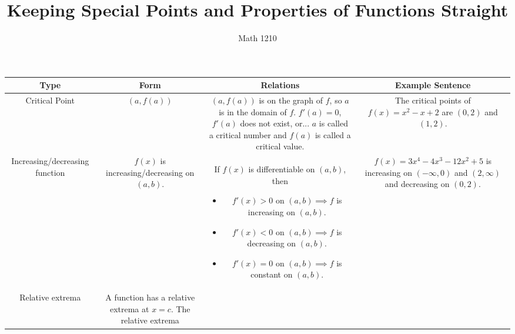 \documentclass[12pt, landscape]{article}
\author{Math 1210}
\title{Keeping Special Points and Properties of Functions Straight}
\date{}
\theoremstyle{mainstyle} %
\begin{document}
\maketitle
\begin{tabular}{c|c|c|c}
  Type
  &Form
  &Relations
  &Example Sentence \\
  \hline
  Critical Point
  &\((a,f(a))\)
  &\parbox{9cm}{\((a,f(a))\) is on the graph of
    \(f\), so \(a\) is in the domain of
    \(f\). \\
  \(f'(a) = 0\), \(f'(a)\) does not exist, or...\\
  \(a\) is called a critical number and \(f(a)\) is called a critical value.}
  &\parbox{5cm}{The critical points of \(f(x) = x^2-x+2\) are
    \((0,2)\) and \((1,2)\).} \\
  \hline
  Increasing/decreasing function
  & \parbox{4cm}{\(f(x)\) is increasing/decreasing on \((a,b)\).}
  & \parbox{9cm}{If \(f(x)\) is differentiable on \((a,b)\), then
    \begin{itemize}
    \item \(f'(x) > 0\) on \((a,b) \implies f\) is increasing on \((a,b)\).
    \item \(f'(x) < 0\) on \((a,b) \implies f\) is decreasing on \((a,b)\).
    \item \(f'(x) = 0\) on \((a,b) \implies f\) is constant on \((a,b)\).
    \end{itemize}
    }
  & \parbox{5cm}{\(f(x) = 3x^4 - 4x^3 - 12x^2 + 5\) is increasing on
    \((-\infty, 0)\) and \((2,\infty)\) and decreasing on \((0,2)\).} \\
  \hline
  Relative extrema
  & \parbox{4cm}{A function has a relative extrema at \(x=c\). The
    relative extrema } 
\end{tabular}
\end{document}
